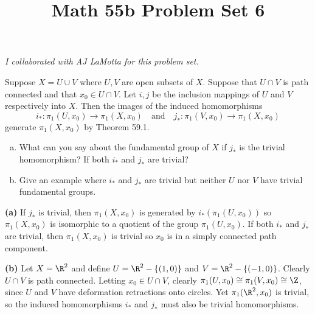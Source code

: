 \documentclass[11pt,letterpaper]{article}
\title{\textbf{Math 55b Problem Set 6}}
\begin{document}
\maketitle

\textit{I collaborated with AJ LaMotta for this problem set.}

\begin{problem}%
    Suppose $X=U\cup V$ where $U,V$ are open subsets of $X$. Suppose that $U\cap V$ is path connected and that $x_0\in U\cap V$. Let $i,j$ be the inclusion mappings of $U$ and $V$ respectively into $X$. Then the images of the induced homomorphisms
    \[
        i_* : \pi_1(U,x_0) \to \pi_1(X,x_0)\quad \mathrm{and}\quad j_* : \pi_1(V,x_0) \to \pi_1(X,x_0)
    \]
    generate $\pi_1(X,x_0)$ by Theorem 59.1.
    \begin{enumerate}[(a)]
        \item What can you say about the fundamental group of $X$ if $j_*$ is the trivial homomorphism? If both $i_*$ and $j_*$ are trivial?
        \item Give an example where $i_*$ and $j_*$ are trivial but neither $U$ nor $V$ have trivial fundamental groups.
    \end{enumerate} 
\end{problem}

\begin{solution}
    \textbf{(a)} If $j_*$ is trivial, then $\pi_1(X,x_0)$ is generated by $i_*(\pi_1(U,x_0))$ so $\pi_1(X,x_0)$ is isomorphic to a quotient of the group $\pi_1(U,x_0)$. If both $i_*$ and $j_*$ are trivial, then $\pi_1(X,x_0)$ is trivial so $x_0$ is in a simply connected path component. 

    \textbf{(b)} Let $X=\R^2$ and define $U=\R^2-\{(1,0)\}$ and $V=\R^2-\{(-1,0)\}$. Clearly $U\cap V$ is path connected. Letting $x_0\in U\cap V$, clearly $\pi_1(U,x_0)\cong \pi_1(V,x_0)\cong \Z$, since $U$ and $V$ have deformation retractions onto circles. Yet $\pi_1(\R^2,x_0)$ is trivial, so the induced homomorphisms $i_*$ and $j_*$ must also be trivial homomorphisms. 
\end{solution}
\end{document}
